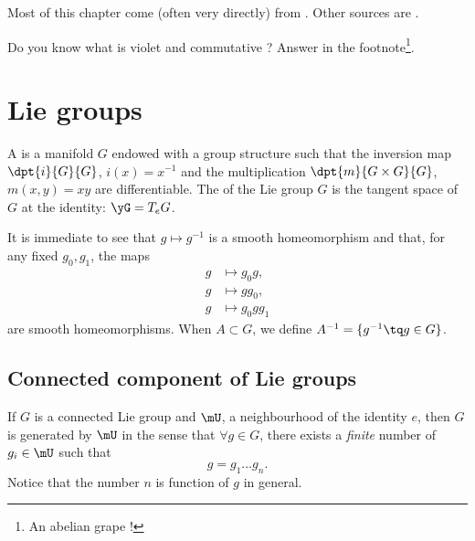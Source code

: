 
Most of this chapter come (often very directly) from \cite{Helgason}. Other sources are \cite{Knapp_reprez,DirkEnvFiniteDimNilLieAlg,SamelsonNotesLieAlg,SternLieAlgebra}.

Do you know what is violet and commutative ? Answer in the footnote\footnote{An abelian grape !}.

\section{Lie groups}

A  is a manifold $G$ endowed with a group structure such that the inversion map $\dpt{i}{G}{G}$, $i(x)=x^{-1}$ and the multiplication $\dpt{m}{G\times G}{G}$, $m(x,y)=xy$ are differentiable. The  of the Lie group $G$ is the tangent space of $G$ at the identity: $\yG=T_eG$. 

 It is immediate to see that $g\mapsto g^{-1}$ is a smooth homeomorphism and that, for any fixed $g_0, g_1$, the maps
\[ 
\begin{split}
   g&\mapsto g_0g,\\
g&\mapsto gg_0,\\
g&\mapsto g_0gg_1
\end{split}  
\]
are smooth homeomorphisms. When $A\subset G$, we define $A^{-1}=\{ g^{-1}\tq g\in G \}$.

\subsection{Connected component of Lie groups}

\begin{proposition}		\label{PropUssGpGenere} 
If $G$ is a connected Lie group and $\mU$, a neighbourhood of the identity $e$, then $G$ is generated by $\mU$ in the sense that $\forall g\in G$, there exists a \emph{finite} number of $g_{i}\in \mU$ such that
\[ 
  g=g_1\ldots g_n.
\]
Notice that the number $n$ is function of $g$ in general.
\end{proposition}

